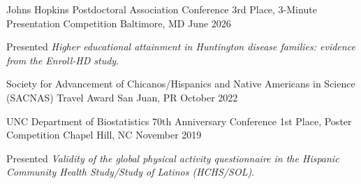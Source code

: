 

\begin{cventries}

\cventry
{Johns Hopkins Postdoctoral Association Conference} %
{3rd Place, 3-Minute Presentation Competition} %
{Baltimore, MD} %
{June 2026} %
{
\begin{cvitems}
\item Presented \textit{Higher educational attainment in Huntington disease families: evidence from the Enroll-HD study}.
\end{cvitems}
}

\cventry
{Society for Advancement of Chicanos/Hispanics and Native Americans in Science (SACNAS)} %
{Travel Award} %
{San Juan, PR} %
{October 2022} %
{}

\cventry
{UNC Department of Biostatistics 70th Anniversary Conference} %
{1st Place, Poster Competition} %
{Chapel Hill, NC} %
{November 2019} %
{
\begin{cvitems}
\item Presented \textit{Validity of the global physical activity questionnaire in the Hispanic Community Health Study/Study of Latinos (HCHS/SOL)}.
\end{cvitems}
}

\end{cventries}
